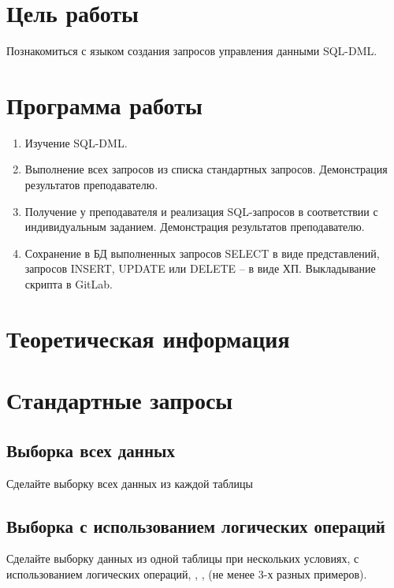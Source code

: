 





\tableofcontents
\newpage

\section{Цель работы}

Познакомиться с языком создания запросов управления данными SQL-DML.

\section{Программа работы}

\begin{enumerate}
	\item Изучение SQL-DML.
	\item Выполнение всех запросов из списка стандартных запросов. Демонстрация результатов преподавателю.
	\item Получение у преподавателя и реализация SQL-запросов в соответствии с индивидуальным заданием. Демонстрация результатов преподавателю.
	\item Сохранение в БД выполненных запросов SELECT в виде представлений, запросов INSERT, UPDATE или DELETE -- в виде ХП. Выкладывание скрипта в GitLab.
\end{enumerate}

\section{Теоретическая информация}

\section{Стандартные запросы}

\subsection{Выборка всех данных}

Сделайте выборку всех данных из каждой таблицы

\subsection{Выборка с использованием логических операций}

Сделайте выборку данных из одной таблицы при нескольких условиях, с использованием логических операций, , ,  (не менее 3-х разных примеров).

